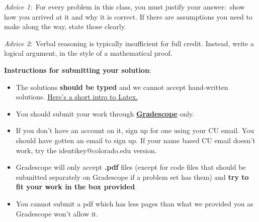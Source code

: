 \documentclass[12pt]{article}
\theoremstyle{remark}
\begin{document}
\renewcommand{\headrulewidth}{0.5pt}

\phantom{Test}

\begin{small}
\textit{Advice 1}:\ For every problem in this class, you must justify your answer:\ show how you arrived at it and why it is correct. If there are assumptions you need to make along the way, state those clearly.
\vspace{-3mm} 

\textit{Advice 2}:\ Verbal reasoning is typically insufficient for full credit. Instead, write a logical argument, in the style of a mathematical proof.\\
\vspace{-3mm} 

\textbf{Instructions for submitting your solution}:
\vspace{-5mm} 

\begin{itemize}
	\item The solutions \textbf{should be typed} and we cannot accept hand-written solutions. \href{http://ece.uprm.edu/~caceros/latex/introduction.pdf}{Here's a short intro to Latex.}
	\item You should submit your work through \href{https://www.gradescope.com/courses/59294}{\textbf{Gradescope}} only.
	\item If you don't have an account on it, sign up for one using your CU email. You should have gotten an email to sign up. If your name based CU email doesn't work, try the identikey@colorado.edu version. 
	\item Gradescope will only accept \textbf{.pdf} files (except for code files that should be submitted separately on Gradescope if a problem set has them) and \textbf{try to fit your work in the box provided}. 
	\item You cannot submit a pdf which has less pages than what we provided you as Gradescope won't allow it. 
\end{itemize}
\vspace{-4mm} 
\end{small}
\end{document}

